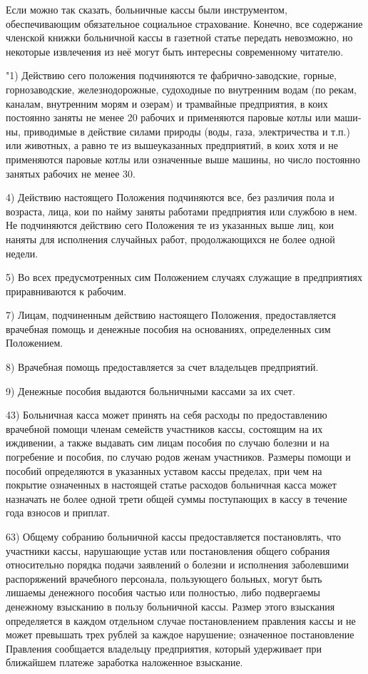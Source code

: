 Если можно так сказать, больничные кассы были инструментом, обеспечивающим
обязательное социальное страхование. Конечно, все содержание членской книжки
больничной кассы в газетной статье передать невозможно, но некоторые извлечения
из неё могут быть интересны современному читателю.

"1) Действию сего положения подчиняются те фабрично-заводские, горные,
горнозаводские, железнодорожные, судоходные по внутренним водам (по рекам,
каналам, внутренним морям и озерам) и трамвайные предприятия, в коих постоянно
заняты не менее 20 рабочих и применяются паровые котлы или маши­ны,
приводимые в  действие силами природы (воды, газа, электричества и т.п.) или
животных, а равно те из вышеуказанных предприятий,  в коих хотя и не
применяются паровые котлы или означенные выше машины, но число постоянно
занятых рабочих не менее 30.

4) Действию настоящего Положения подчиняются все, без различия пола и
возраста, лица, кои по найму заняты работами предприятия или службою в нем. Не
подчиняются действию сего Положения те из указанных выше лиц, кои наняты для
исполнения случайных работ, продолжающихся не более одной недели.

5) Во всех предусмотренных сим Положением случаях служащие в предприятиях
приравниваются к рабочим.

7) Лицам, подчиненным действию настоящего Положения, предоставляется врачебная
помощь и денежные пособия на основаниях, определенных сим Положением.

8) Врачебная помощь предоставляется за счет владельцев предприятий.

9) Денежные пособия выдаются больничными кассами за их счет.

43) Больничная касса может принять на себя расходы по предоставлению врачебной
помощи членам семейств участников кассы, состоящим на их иждивении, а также
выдавать сим лицам пособия по случаю болезни и на погребение и пособия, по
случаю родов женам участников. Размеры помощи и пособий определяются в
указанных уставом кассы пределах, при чем на покрытие означенных в настоящей
статье расходов больничная касса может назначать не более одной трети общей
суммы поступающих в кассу в течение года взносов и приплат.

63) Общему собранию больничной кассы предоставляется постановлять, что
участники кассы, нарушающие устав или постановления общего собрания
относительно порядка подачи заявлений о болезни и исполнения заболевшими
распоряжений врачебного персонала, пользующего больных, могут быть лишаемы
денежного пособия частью или полностью, либо подвергаемы денежному взысканию в
пользу больничной кассы. Размер этого взыскания определяется в каждом отдельном
случае постановлением правления кассы и не может превышать трех рублей за
каждое нарушение; означенное постановление Правления сообщается владельцу
предприятия, который удерживает при ближайшем платеже заработка наложенное
взыскание.


